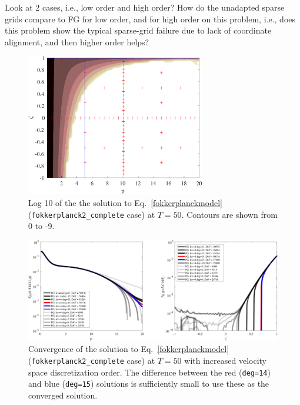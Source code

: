 \documentclass[preprint,11pt]{elsarticle}
\begin{document}
Look at 2 cases, i.e., low order and high order? How do the unadapted sparse grids compare to FG for low order, and for high order on this problem, i.e., does this problem show the typical sparse-grid failure due to lack of coordinate alignment, and then higher order helps? 
%
\begin{figure}
    \centering
    \includegraphics[width=0.7\textwidth]{FIGURES/asgard-sg-2d-plus-grid-lev5-deg12.pdf}
    \caption{Log 10 of the the solution to Eq.~\ref{fokkerplanckmodel} (\texttt{fokkerplanck2\_complete} case) at $T=50$. Contours are shown from 0 to -9.}
    \label{fig:sg-solution}
\end{figure}
%
%
\begin{figure}
    \centering
    \includegraphics[width=1.2\textwidth]{FIGURES/asgard-2d-slice-fg.pdf}
    \caption{Convergence of the solution to Eq.~\ref{fokkerplanckmodel} (\texttt{fokkerplanck2\_complete} case) at $T=50$ with increased velocity space discretization order. The difference between the red (\texttt{deg=14}) and blue (\texttt{deg=15}) solutions is sufficiently small to use these as the converged solution.}
    \label{fig:fg-slices}
\end{figure}
%
\end{document}
